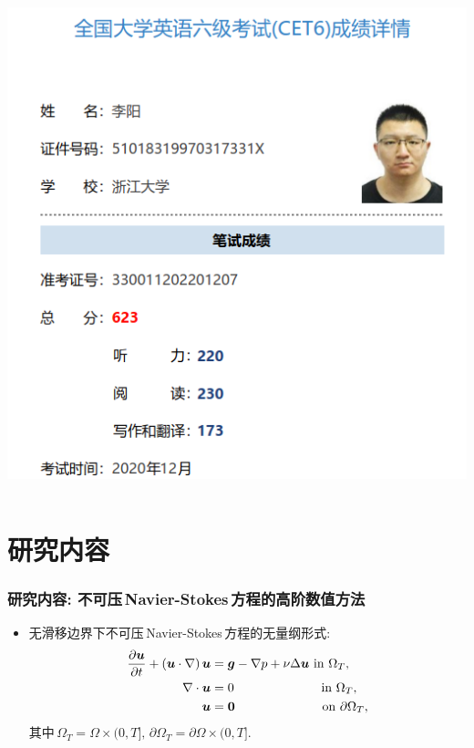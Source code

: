 \documentclass{beamer}
\begin{document}
\begin{CJK*}{UTF8}{gkai}
\begin{frame}
\begin{columns}
\begin{column}{.5\linewidth}
\begin{center}
          \includegraphics[scale=0.30]{./png/cet6}
        \end{center}
      \end{column}
    \end{columns}
  \end{frame}

  \section{研究内容}
  \begin{frame}
    \frametitle{研究内容: 不可压\,Navier-Stokes\,方程的高阶数值方法}
    \begin{itemize}
    \item 无滑移边界下不可压\,Navier-Stokes\,方程的无量纲形式:
      \begin{equation}
        \label{eq:INSE}
        \begin{split}
          \frac{\partial \bm{u}}{\partial t}+ \left( \bm{u}\cdot\nabla \right)\bm{u} &= \bm{g}-\nabla p+\nu\Delta \bm{u} \text{ in } \Omega_T, \\
          \nabla\cdot \bm{u} &= 0 \hspace{23mm} \text{ in } \Omega_T, \\
          \bm{u} &= \mathbf{0} \hspace{23mm} \text{ on } \partial\Omega_T,
        \end{split}
      \end{equation}
      其中\,$\Omega_T=\Omega\times (0, T], \,\partial\Omega_T=\partial\Omega\times (0, T]$.


\end{itemize}
\end{frame}
\end{CJK*}
\end{document}
